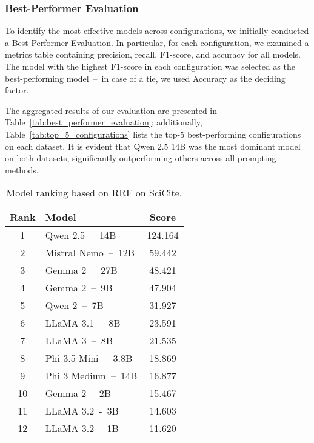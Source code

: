 \subsubsection{Best-Performer Evaluation}\label{sec:best_performer_evaluation}

To identify the most effective models across configurations, we initially conducted a Best-Performer Evaluation. In particular, for each configuration, we examined a metrics table containing precision, recall, F1-score, and accuracy for all models. 
The model with the highest F1-score in each configuration was selected as the best-performing model~--~in case of a tie, we used Accuracy as the deciding factor. 

The aggregated results of our evaluation are presented in Table~\ref{tab:best_performer_evaluation};
additionally, Table~\ref{tab:top_5_configurations} lists the top-$5$ best-performing configurations on each dataset.
It is evident that Qwen 2.5 14B was the most dominant model on both datasets, significantly outperforming others across all prompting methods.


\begin{table}[t]
    \centering
    \footnotesize
    \begin{tabular}{clc}
      \hline
      \textbf{Rank} &   \textbf{Model}          &   \textbf{Score} \\
      \hline
      1	            &   Qwen 2.5~--~14B         &   124.164        \\
      2	            &   Mistral Nemo~--~12B     &   59.442         \\
      3	            &   Gemma 2~--~27B          &   48.421         \\
      4	            &   Gemma 2~--~9B           &   47.904         \\
      5	            &   Qwen 2~--~7B            &   31.927         \\
      6	            &   LLaMA 3.1~--~8B         &   23.591         \\
      7	            &   LLaMA 3~--~8B           &   21.535         \\
      8	            &   Phi 3.5 Mini~--~3.8B    &   18.869         \\
      9	            &   Phi 3 Medium~--~14B     &   16.877         \\
      10	        &   Gemma 2~-~2B            &   15.467         \\
      11            &   LLaMA 3.2~-~3B          &   14.603         \\
      12            &   LLaMA 3.2~-~1B          &   11.620         \\
      \hline
    \end{tabular}
    \caption{Model ranking based on RRF on SciCite.}\label{tab:rrf_evaluation_scicite}
\end{table}

